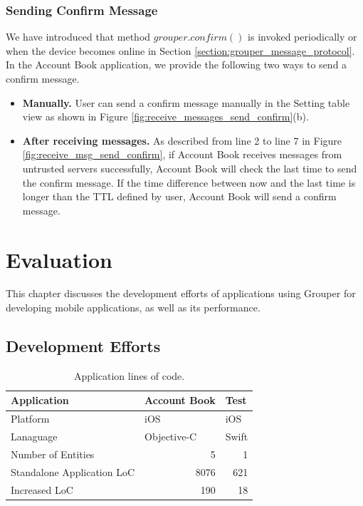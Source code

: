 \documentclass[a4paper,11pt]{report}
\begin{document}
\subsection{Sending Confirm Message}

We have introduced that method $grouper.confirm()$ is invoked periodically or when the device becomes online in Section \ref{section:grouper_message_protocol}.
In the Account Book application, we provide the following two ways to send a confirm message.

\begin{itemize}[leftmargin=7mm]
	\setlength{\itemsep}{1pt}
	\setlength{\parskip}{0pt}
	\setlength{\parsep}{0pt}
	\item \textbf{Manually.}
	User can send a confirm message manually in the Setting table view as shown in Figure \ref{fig:receive_messages_send_confirm}(b).
	\item \textbf{After receiving messages.}
	As described from line 2 to line 7 in Figure \ref{fig:receive_msg_send_confirm}, if Account Book receives messages from untrusted servers successfully, Account Book will check the last time to send the confirm message.
	If the time difference between now and the last time is longer than the TTL defined by user, Account Book will send a confirm message.

\end{itemize}

\chapter{Evaluation} \label{chapter:evaluation}

This chapter discusses the development efforts of applications using Grouper for developing mobile applications, as well as its performance.

\section{Development Efforts} \label{section:development_efforts}

\begin{table}
	\centering
	\caption{Application lines of code.}
	\label{table:loc}
	\begin{tabular}{lll}
		\toprule
		\textbf{Application} & \textbf{Account Book} & \textbf{Test} \\ 
		\midrule
		Platform & iOS & iOS \\ 
		Lanaguage & Objective-C & Swift \\ 
		Number of Entities & \multicolumn{1}{r}{5} & \multicolumn{1}{r}{1} \\ 
		Standalone Application LoC & \multicolumn{1}{r}{8076} & \multicolumn{1}{r}{621} \\ 
		Increased LoC &  \multicolumn{1}{r}{190} &  \multicolumn{1}{r}{18} \\ 
		\bottomrule
	\end{tabular}
\end{table}
\end{document}
